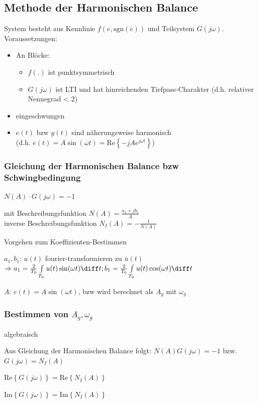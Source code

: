 \documentclass[german]{latex4ei/latex4ei_sheet}
\begin{document}
\begin{sectionbox}
\subsection{Methode der Harmonischen Balance}

System besteht aus Kennlinie $f(e, \text{sgn}(\dot{e}))$ und Teilsystem $G(j\omega)$. \\
Voraussetzungen:
\begin{itemize}
  \item An Blöcke:
    \begin{itemize}
      \item $f(.)$ ist punktsymmetrisch
      \item $G(j\omega)$ ist LTI und hat hinreichenden Tiefpass-Charakter (d.h. relativer Nennegrad < 2)
    \end{itemize}
  \item eingeschwungen
  \item $e(t)$ bzw $y(t)$ sind näherungsweise harmonisch \\ (d.h. $e(t) = A \sin(\omega t) = \text{Re} \left\{ -j A e^{j\omega t} \right\}$)
\end{itemize}

\subsubsection{Gleichung der Harmonischen Balance bzw Schwingbedingung}
\begin{emphbox}
  $N(A) \cdot G(j\omega) = -1$
\end{emphbox}
mit Beschreibungsfunktion $N(A) = \frac{a_1 + j b_1}{A}$ \\
inverse Beschreibungsfunktion $N_I(A) = - \frac{1}{N(A)}$ \\

\begin{cookbox}{Vorgehen zum Koeffizienten-Bestimmen}
  \item $a_1, b_1$:  $u(t)$ fourier-transformieren zu $\bar{u}(t)$ \\
    $\Rightarrow a_1 = \frac{2}{T_0} \int\limits_{T_0} u(t) \sin(\omega t) \diff t; \\
                 b_1 = \frac{2}{T_0} \int\limits_{T_0} u(t) \cos(\omega t) \diff t$
  \item $A$: $e(t) = A \sin(\omega t)$, bzw wird berechnet als $A_g$ mit $\omega_g$
\end{cookbox}

\subsubsection{Bestimmen von $A_g, \omega_g$}
\begin{cookbox}{algebraisch}
  \item Aus Gleichung der Harmonischen Balance folgt: $N(A)G(j\omega) = -1$ bzw. $G(j \omega) = N_I(A)$
  \item $\text{Re}\left\{ G(j \omega) \right\} = \text{Re} \left\{ N_I(A) \right\}$
  \item $\text{Im}\left\{ G(j \omega) \right\} = \text{Im} \left\{ N_I(A) \right\}$
\end{cookbox}


\end{sectionbox}
\end{document}
